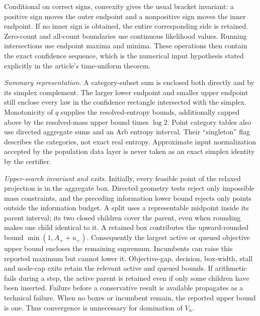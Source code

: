 \documentclass[10pt]{article}
\begin{document}
Conditional on correct signs, convexity gives the usual bracket invariant: a positive sign moves the outer endpoint and a nonpositive sign moves the inner endpoint. If no inner sign is obtained, the entire corresponding side is retained. Zero-count and all-count boundaries use continuous likelihood values. Running intersections use endpoint maxima and minima. These operations then contain the exact confidence sequence, which is the numerical input hypothesis stated explicitly in the article's time-uniform theorem.

\emph{Summary representation.} A category-subset sum is enclosed both directly and by its simplex complement. The larger lower endpoint and smaller upper endpoint still enclose every law in the confidence rectangle intersected with the simplex. Monotonicity of $q$ supplies the resolved-entropy bounds, additionally capped above by the resolved-mass upper bound times $\log2$. Point category tables also use directed aggregate sums and an Arb entropy interval. Their ``singleton'' flag describes the categories, not exact real entropy. Approximate input normalization accepted by the population data layer is never taken as an exact simplex identity by the certifier.

\emph{Upper-search invariant and exits.} Initially, every feasible point of the relaxed projection is in the aggregate box. Directed geometry tests reject only impossible mass constraints, and the preceding information lower bound rejects only points outside the information budget. A split uses a representable midpoint inside its parent interval; its two closed children cover the parent, even when rounding makes one child identical to it. A retained box contributes the upward-rounded bound $\min(1,A_++u_+)$. Consequently the largest active or queued objective upper bound encloses the remaining supremum. Incumbents can raise this reported maximum but cannot lower it. Objective-gap, decision, box-width, stall and node-cap exits retain the relevant active and queued bounds. If arithmetic fails during a step, the active parent is retained even if only some children have been inserted. Failure before a conservative result is available propagates as a technical failure. When no boxes or incumbent remain, the reported upper bound is one. Thus convergence is unnecessary for domination of $V_n$.
\end{document}
